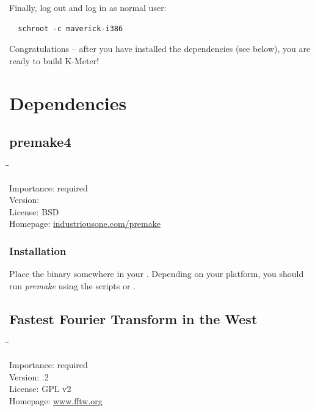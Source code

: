 Finally, log out and log in as normal user:

\begin{verbatim}
  schroot -c maverick-i386
\end{verbatim}

Congratulations -- after you have installed the dependencies (see
below), you are ready to build K-Meter!

\section{Dependencies}

\subsection{premake4}

\begin{tabbing}
  \hspace*{6em}\=\=\kill

  Importance:  \> required \\
  Version:      \\
  License:     \> BSD \\
  Homepage:    \> \href{http://industriousone.com/premake}{industriousone.com/premake}
\end{tabbing}

\subsubsection{Installation}

Place the binary somewhere in your .  Depending on your
platform, you should run \emph{premake} using the scripts
 or .

\newpage %

\subsection{Fastest Fourier Transform in the West}

\begin{tabbing}
  \hspace*{6em}\=\=\kill

  Importance:  \> required \\
  Version:     .2 \\
  License:     \> GPL v2 \\
  Homepage:    \> \href{http://www.fftw.org/}{www.fftw.org}
\end{tabbing}

